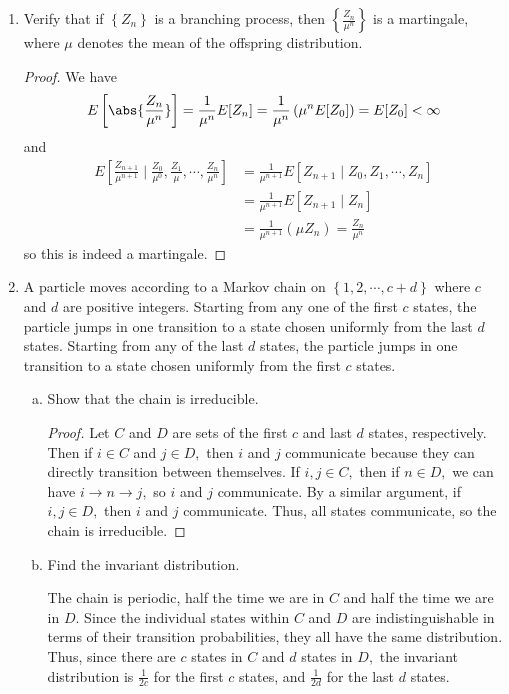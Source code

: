 \documentclass{article}
\begin{document}
\begin{enumerate}
	\item Verify that if $\left\{ Z_n \right\}$ is a branching process, then $\left\{ \frac{Z_n}{\mu^n} \right\}$ is a martingale, where $\mu$ denotes the mean of the offspring distribution.
		\begin{proof}
			We have
			\begin{align*}
				E\left[ \abs{\frac{Z_n}{\mu^n}} \right] = \frac{1}{\mu^n} E[Z_n] = \frac{1}{\mu^n} \left(\mu^n E[Z_0]\right) = E[Z_0] < \infty
			\end{align*}
			and
			\begin{align*}
				E\left[ \frac{Z_{n+1}}{\mu^{n+1}}\mid \frac{Z_0}{\mu^0}, \frac{Z_1}{\mu}, \cdots, \frac{Z_n}{\mu^n} \right] &= \frac{1}{\mu^{n+1}} E[Z_{n+1}\mid Z_0, Z_1, \cdots, Z_n] \\
				&= \frac{1}{\mu^{n+1}} E[Z_{n+1}\mid Z_n] \\
				&= \frac{1}{\mu^{n+1}}(\mu Z_n) = \frac{Z_n}{\mu^n}
			\end{align*}
			so this is indeed a martingale.
		\end{proof}

	\item A particle moves according to a Markov chain on $\left\{ 1, 2, \cdots, c+d \right\}$ where $c$ and $d$ are positive integers. Starting from any one of the first $c$ states, the particle jumps in one transition to a state chosen uniformly from the last $d$ states. Starting from any of the last $d$ states, the particle jumps in one transition to a state chosen uniformly from the first $c$ states.
		\begin{enumerate}[(a)]
			\item Show that the chain is irreducible.
				\begin{proof}
					Let $C$ and $D$ are sets of the first $c$ and last $d$ states, respectively. Then if $i\in C$ and $j\in D,$ then $i$ and $j$ communicate because they can directly transition between themselves. If $i, j\in C,$ then if $n\in D,$ we can have $i\to n\to j,$ so $i$ and $j$ communicate. By a similar argument, if $i, j\in D,$ then $i$ and $j$ communicate. Thus, all states communicate, so the chain is irreducible.
				\end{proof}

			\item Find the invariant distribution.
				\begin{soln}
					The chain is periodic, half the time we are in $C$ and half the time we are in $D.$ Since the individual states within $C$ and $D$ are indistinguishable in terms of their transition probabilities, they all have the same distribution. Thus, since there are $c$ states in $C$ and $d$ states in $D,$ the invariant distribution is $\frac{1}{2c}$ for the first $c$ states, and $\frac{1}{2d}$ for the last $d$ states.
				\end{soln}
				
		\end{enumerate}

\end{enumerate}
\end{document}
